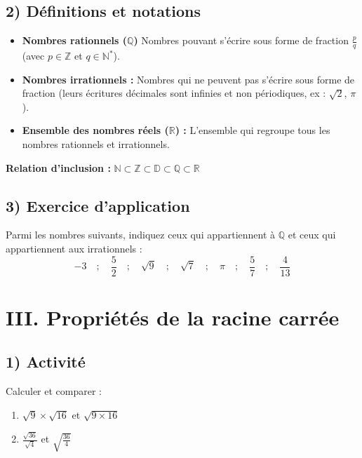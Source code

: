 \documentclass[12pt,a4paper]{article}
\begin{document}
\subsection*{\color{myred} 2) Définitions et notations}
\begin{itemize}
    \item \textbf{Nombres rationnels ($\mathbb{Q}$)} Nombres pouvant s'écrire sous forme de fraction $\frac{p}{q}$ (avec $p \in \mathbb{Z}$ et $q \in \mathbb{N}^*$).
    \item \textbf{Nombres irrationnels :} Nombres qui ne peuvent pas s'écrire sous forme de fraction (leurs écritures décimales sont infinies et non périodiques, ex : $\sqrt{2}$, $\pi$).
    \item \textbf{Ensemble des nombres réels ($\mathbb{R}$) :} L'ensemble qui regroupe tous les nombres rationnels et irrationnels.
\end{itemize}

\noindent \textbf{Relation d'inclusion :}
$
\mathbb{N} \subset \mathbb{Z} \subset \mathbb{D} \subset \mathbb{Q} \subset \mathbb{R}
$

\subsection*{\color{myred} 3) Exercice d’application}
Parmi les nombres suivants, indiquez ceux qui appartiennent à $\mathbb{Q}$ et ceux qui appartiennent aux irrationnels :
\[
-3 \quad ; \quad \frac{5}{2} \quad ; \quad \sqrt{9} \quad ; \quad \sqrt{7} \quad ; \quad \pi \quad ; \quad \frac{5}{7} \quad ; \quad \frac{4}{13}
\]

\section*{\color{myred}III. Propriétés de la racine carrée}

\subsection*{\color{myred} 1) Activité}
Calculer et comparer :
\begin{enumerate}
    \item $\sqrt{9} \times \sqrt{16}$ et $\sqrt{9 \times 16}$
   \item $\frac{\sqrt{36}}{\sqrt{4}}$ et $\sqrt{\frac{36}{4}}$
\end{enumerate}
\end{document}
